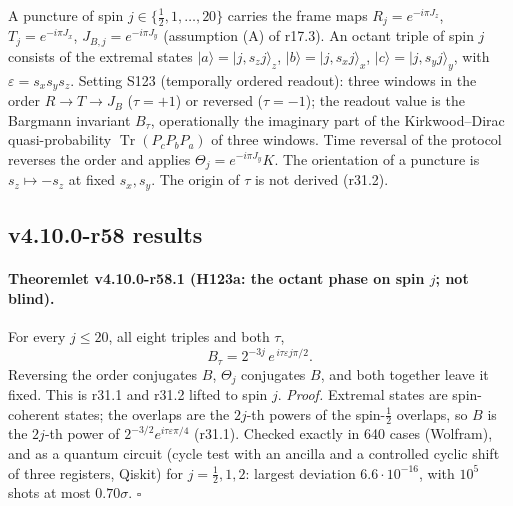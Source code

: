 A puncture of spin \(j\in\{\tfrac12,1,\dots,20\}\) carries the frame maps \(R_j=e^{-i\pi J_z}\), \(T_j=e^{-i\pi J_x}\), \(J_{B,j}=e^{-i\pi J_y}\) (assumption (A) of r17.3).
An octant triple of spin \(j\) consists of the extremal states \(|a\rangle=|j,s_zj\rangle_z\), \(|b\rangle=|j,s_xj\rangle_x\), \(|c\rangle=|j,s_yj\rangle_y\), with
\(\varepsilon=s_xs_ys_z\).  Setting S123 (temporally ordered readout): three windows in the order \(R\to T\to J_B\) (\(\tau=+1\)) or reversed (\(\tau=-1\)); the
readout value is the Bargmann invariant \(B_\tau\), operationally the imaginary part of the Kirkwood--Dirac quasi-probability \(\operatorname{Tr}(P_cP_bP_a)\)
of three windows.  Time reversal of the protocol reverses the order and applies \(\Theta_j=e^{-i\pi J_y}K\).  The orientation of a puncture is
\(s_z\mapsto-s_z\) at fixed \(s_x,s_y\).  The origin of \(\tau\) is not derived (r31.2).

\subsection*{v4.10.0-r58 results}
\label{subsec:v4100-r58-results}

\paragraph{Theoremlet v4.10.0-r58.1 (H123a: the octant phase on spin \(j\); not blind).}
For every \(j\le20\), all eight triples and both \(\tau\),
\[
B_\tau=2^{-3j}\,e^{\,i\tau\varepsilon j\pi/2}.
\]
Reversing the order conjugates \(B\), \(\Theta_j\) conjugates \(B\), and both together leave it fixed.  This is r31.1 and r31.2 lifted to spin \(j\).
\emph{Proof.} Extremal states are spin-coherent states; the overlaps are the \(2j\)-th powers of the spin-\(\tfrac12\) overlaps, so \(B\) is the \(2j\)-th power of
\(2^{-3/2}e^{i\tau\varepsilon\pi/4}\) (r31.1).  Checked exactly in 640 cases (Wolfram), and as a quantum circuit (cycle test with an ancilla and a
controlled cyclic shift of three registers, Qiskit) for \(j=\tfrac12,1,2\): largest deviation \(6.6\cdot10^{-16}\), with \(10^5\) shots at most \(0.70\sigma\).  \(\square\)

